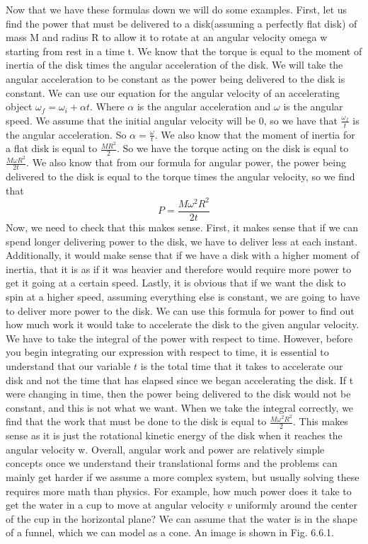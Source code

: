 \documentclass{article}[gray]
\numberwithin{equation}{subsection}
\begin{document}
Now that we have these formulas down we will do some examples. 
First, let us find the power that must be delivered to a disk(assuming a perfectly flat disk) of mass M and radius R to allow it to rotate at an angular velocity omega w starting from rest in a time t. We know that the torque is equal to the moment of inertia of the disk times the angular acceleration of the disk. We will take the angular acceleration to be constant as the power being delivered to the disk is constant. We can use our equation for the angular velocity of an accelerating object $\omega_f=\omega_i+\alpha t$. Where $\alpha$ is the angular acceleration and $\omega$ is the angular speed. We assume that the initial angular velocity will be 0, so we have that $\frac{\omega_f}{t}$ is the angular acceleration. So $\alpha =\frac{\omega}{t}$. We also know that the moment of inertia for a flat disk is equal to $\frac{MR^2}{2}$. So we have the torque acting on the disk is equal to $\frac{M\omega R^2}{2t}$. We also know that from our formula for angular power, the power being delivered to the disk is equal to the torque times the angular velocity, so we find that \begin{equation}P = \frac{M\omega^2 R^2}{2t}\end{equation} Now, we need to check that this makes sense. First, it makes sense that if we can spend longer delivering power to the disk, we have to deliver less at each instant. Additionally, it would make sense that if we have a disk with a higher moment of inertia, that it is as if it was heavier and therefore would require more power to get it going at a certain speed. Lastly, it is obvious that if we want the disk to spin at a higher speed, assuming everything else is constant, we are going to have to deliver more power to the disk. We can use this formula for power to find out how much work it would take to accelerate the disk to the given angular velocity. We have to take the integral of the power with respect to time. However, before you begin integrating our expression with respect to time, it is essential to understand that our variable $t$ is the total time that it takes to accelerate our disk and not the time that has elapsed since we began accelerating the disk. If t were changing in time, then the power being delivered to the disk would not be constant, and this is not what we want. When we take the integral correctly, we find that the work that must be done to the disk is equal to $\frac{M\omega^2R^2}{2}$. This makes sense as it is just the rotational kinetic energy of the disk when it reaches the angular velocity w. Overall, angular work and power are relatively simple concepts once we understand their translational forms and the problems can mainly get harder if we assume a more complex system, but usually solving these requires more math than physics. For example, how much power does it take to get the water in a cup to move at angular velocity $v$ uniformly around the center of the cup in the horizontal plane? We can assume that the water is in the shape of a funnel, which we can model as a cone. An image is shown in Fig. 6.6.1.
\end{document}
